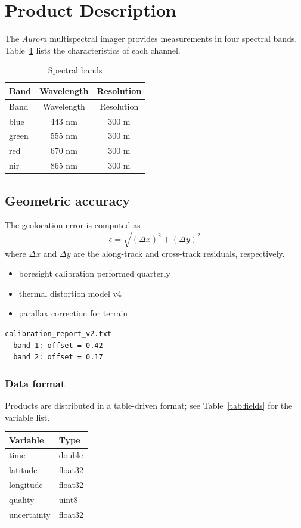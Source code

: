 \documentclass{article}
\begin{document}
\section{Product Description}

The \textit{Aurora} multispectral imager provides measurements in
four spectral bands. Table~\ref{tab:bands} lists the characteristics
of each channel.

\begin{longtable}{|l|c|c|}
\caption{Spectral bands}\label{tab:bands}\\
\hline
Band & Wavelength & Resolution\\
\hline
\endfirsthead
\hline
Band & Wavelength & Resolution\\
\hline
\endhead
blue   & 443 nm & 300 m\\
green  & 555 nm & 300 m\\
red    & 670 nm & 300 m\\
nir    & 865 nm & 300 m\\
\hline
\end{longtable}

\subsection{Geometric accuracy}

The geolocation error is computed as
\begin{equation}
  \epsilon = \sqrt{(\Delta x)^2 + (\Delta y)^2}
\end{equation}
where $\Delta x$ and $\Delta y$ are the along-track and cross-track
residuals, respectively.

\begin{itemize}
\item boresight calibration performed quarterly
\item thermal distortion model v4
\item parallax correction for terrain
\end{itemize}

\begin{verbatim}
calibration_report_v2.txt
  band 1: offset = 0.42
  band 2: offset = 0.17
\end{verbatim}

\subsubsection{Data format}\label{sec:format}

Products are distributed in a table-driven format; see
Table~\ref{tab:fields} for the variable list.

\begin{longtable}{|l|l|}
\hline
Variable & Type\\
\hline
time       & double\\
latitude   & float32\\
longitude  & float32\\
quality    & uint8\\
uncertainty & float32\\
\hline
\end{longtable}
\end{document}
